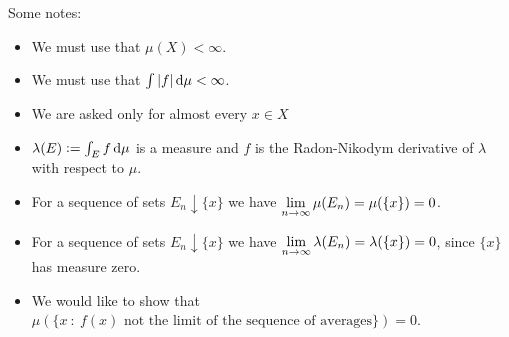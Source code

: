 Some notes:
\begin{itemize}
\item We must use that $\mu(X) < \infty$.
\item We must use that $\int |f| \dmu < \infty$.
\item We are asked only for almost every $x \in X$
\item $\lambda(E) := \int_E f \dmu$ is a measure and $f$ is the Radon-Nikodym derivative of $\lambda$ with respect to $\mu$.
\item For a sequence of sets $E_n \downarrow \{x\}$ we have $\limninf \mu(E_n) = \mu(\{x\}) = 0$.
\item For a sequence of sets $E_n \downarrow \{x\}$ we have $\limninf \lambda(E_n) = \lambda(\{x\}) = 0$, since $\{x\}$ has measure zero.
\item We would like to show that $\mu(\{x ~:~ f(x) \text{~not the limit of the sequence of averages}\}) = 0$.
\end{itemize}








